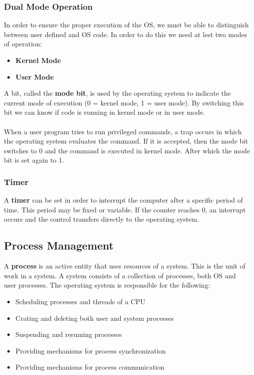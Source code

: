\documentclass{article}
\begin{document}
\subsubsection{Dual Mode Operation}
In order to ensure the proper execution of the OS, we must be able to distinguish between user defined and OS code. In order to do this we need at lest two modes of operation:

\begin{itemize}
	\item \textbf{Kernel Mode}
	\item \textbf{User Mode}
\end{itemize}
A bit, called the \textbf{mode bit}, is used by the operating system to indicate the current mode of execution (0 = kernel mode, 1 = user mode). By switching this bit we can know if code is running in kernel mode or in user mode. \\ \\
When a user program tries to run privileged commands, a trap occurs in which the operating system evaluates the command. If it is accepted, then the mode bit switches to 0 and the command is executed in kernel mode. After which the mode bit is set again to 1. 

\subsubsection{Timer}
A \textbf{timer} can be set in order to interrupt the computer after a specific period of time. This period may be fixed or variable. If the counter reaches 0, an interrupt occurs and the control transfers directly to the operating system.

\subsection{Process Management}
A \textbf{process} is an active entity that uses resources of a system. This is the unit of work in a system. A system consists of a collection of processes, both OS and user processes. The operating system is responsible for the following:

\begin{itemize}
	\item Scheduling processes and threads of a CPU
	\item Crating and deleting both user and system processes
	\item Suspending and resuming processes
	\item Providing mechanisms for process synchronization
	\item Providing mechanisms for process communication
\end{itemize}
\end{document}
